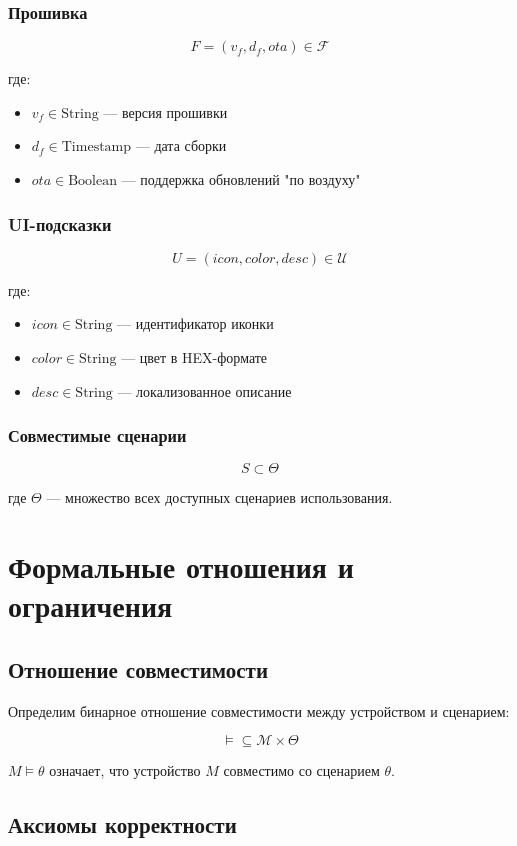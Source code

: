 \documentclass{article}
\begin{document}
\subsubsection{Прошивка}
\[
F = (v_f, d_f, ota) \in \mathcal{F}
\]

где:
\begin{itemize}
    \item $v_f \in \text{String}$ — версия прошивки
    \item $d_f \in \text{Timestamp}$ — дата сборки
    \item $ota \in \text{Boolean}$ — поддержка обновлений "по воздуху"
\end{itemize}

\subsubsection{UI-подсказки}
\[
U = (icon, color, desc) \in \mathcal{U}
\]

где:
\begin{itemize}
    \item $icon \in \text{String}$ — идентификатор иконки
    \item $color \in \text{String}$ — цвет в HEX-формате
    \item $desc \in \text{String}$ — локализованное описание
\end{itemize}

\subsubsection{Совместимые сценарии}
\[
S \subset \Theta
\]

где $\Theta$ — множество всех доступных сценариев использования.

\section{Формальные отношения и ограничения}

\subsection{Отношение совместимости}
Определим бинарное отношение совместимости между устройством и сценарием:

\[
\vDash \subseteq \mathcal{M} \times \Theta
\]

$M \vDash \theta$ означает, что устройство $M$ совместимо со сценарием $\theta$.

\subsection{Аксиомы корректности}
\end{document}

